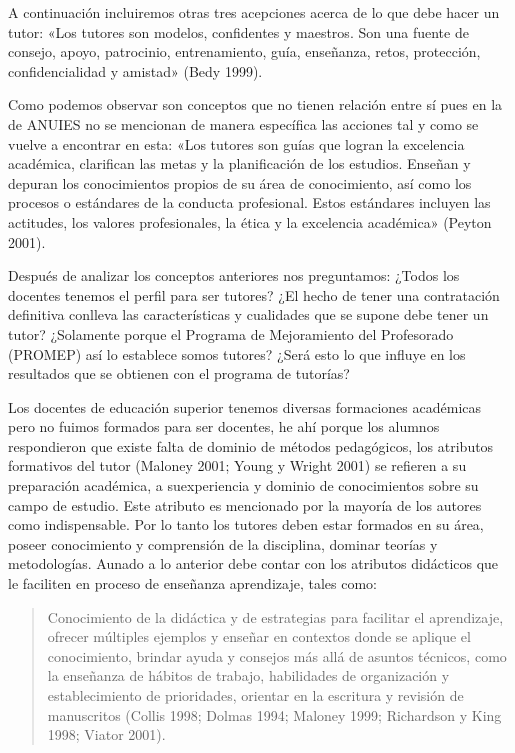 A continuación incluiremos otras tres acepciones acerca de lo que debe hacer
un tutor: «Los tutores son modelos, confidentes y maestros. Son una fuente
de consejo, apoyo, patrocinio, entrenamiento, guía, enseñanza, retos,
protección, confidencialidad y amistad» (Bedy 1999). 

Como podemos observar son conceptos que no tienen relación entre sí pues en la de ANUIES  no se
mencionan de manera específica las acciones tal y como se vuelve a
encontrar en esta: «Los tutores son guías que logran la excelencia
académica, clarifican las metas y la planificación de los estudios. Enseñan
y depuran los conocimientos propios de su área de conocimiento, así como
los procesos o estándares de la conducta profesional. Estos estándares
incluyen las actitudes, los valores profesionales, la ética y la excelencia
académica» (Peyton 2001).


Después de analizar los conceptos anteriores nos preguntamos: ¿Todos los
docentes tenemos el perfil para ser tutores? ¿El hecho de tener una
contratación definitiva conlleva las características y cualidades que se
supone debe tener un tutor? ¿Solamente porque el Programa de Mejoramiento
del Profesorado (PROMEP) así lo establece somos tutores? ¿Será esto lo que
influye en los resultados que se obtienen con el programa de tutorías?

\enlargethispage{1\baselineskip}
Los docentes de educación superior tenemos diversas formaciones académicas
pero no fuimos formados para ser docentes, he ahí porque los alumnos
respondieron que existe falta de dominio de métodos pedagógicos, los
atributos formativos del tutor (Maloney 2001; Young y Wright 2001) se
refieren a su preparación académica, a su\linebreak experiencia y dominio de
conocimientos sobre su campo de estudio. Este atributo es mencionado por la
mayoría de los autores como indispensable. Por lo tanto los tutores deben
estar formados en su área, poseer conocimiento y comprensión de la
disciplina, dominar teorías y metodologías. Aunado a lo anterior debe
contar con los atributos didácticos que le faciliten en proceso de
enseñanza aprendizaje, tales como: 

\begin{quotation}
Conocimiento de la didáctica y de estrategias para facilitar el
aprendizaje, ofrecer múltiples ejemplos y enseñar en contextos donde se
aplique el conocimiento, brindar ayuda y consejos más allá de asuntos
técnicos, como la enseñanza de hábitos de trabajo, habilidades de
organización y establecimiento de prioridades, orientar en la escritura y
revisión de manuscritos (Collis 1998; Dolmas 1994; Maloney 1999;
Richardson y King 1998; Viator 2001).
\end{quotation}

